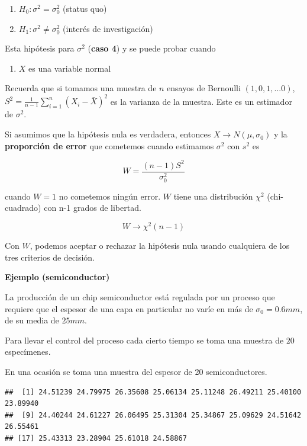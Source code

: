 \documentclass[
]{book}
\providecommand{\tightlist}{%
  \setlength{\itemsep}{0pt}\setlength{\parskip}{0pt}}
\begin{document}
\begin{enumerate}
\def\labelenumi{\alph{enumi}.}
\tightlist
\item
  \(H_0:\sigma^2 = \sigma^2_0\) (status quo)
\item
  \(H_1:\sigma^2 \neq \sigma^2_0\) (interés de investigación)
\end{enumerate}

Esta hipótesis para \(\sigma^2\) (\textbf{caso 4}) y se puede probar cuando

\begin{enumerate}
\def\labelenumi{\arabic{enumi}.}
\tightlist
\item
  \(X\) es una variable normal
\end{enumerate}

Recuerda que si tomamos una muestra de \(n\) ensayos de Bernoulli \((1,0,1,...0)\), \(S^2=\frac{1}{n-1}\sum_{i=1 }^n (X_i-\bar{X})^2\) es la varianza de la muestra. Este es un estimador de \(\sigma^2\).

Si asumimos que la hipótesis nula es verdadera, entonces \(X \rightarrow N(\mu, \sigma_0)\) y la \textbf{proporción de error} que cometemos cuando estimamos \(\sigma^2\) con \(s^2\) es

\[W=\frac{(n-1)S^2}{\sigma_0^2}\]

cuando \(W=1\) no cometemos ningún error. \(W\) tiene una distribución \(\chi^2\) (chi-cuadrado) con n-1 grados de libertad.

\[W \rightarrow \chi^2(n-1)\]

Con \(W\), podemos aceptar o rechazar la hipótesis nula usando cualquiera de los tres criterios de decisión.

\textbf{Ejemplo (semiconductor)}

La producción de un chip semiconductor está regulada por un proceso que requiere que el espesor de una capa en particular no varíe en más de \(\sigma_0=0.6mm\), de su media de \(25mm\).

Para llevar el control del proceso cada cierto tiempo se toma una muestra de \(20\) especímenes.

En una ocasión se toma una muestra del espesor de 20 semiconductores.

\begin{verbatim}
##  [1] 24.51239 24.79975 26.35608 25.06134 25.11248 26.49211 25.40100 23.89940
##  [9] 24.40244 24.61227 26.06495 25.31304 25.34867 25.09629 24.51642 26.55461
## [17] 25.43313 23.28904 25.61018 24.58867
\end{verbatim}
\end{document}

